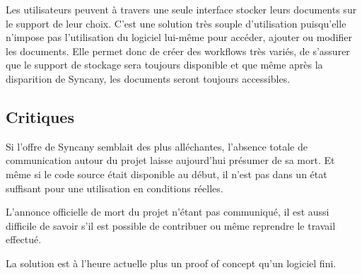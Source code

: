 \vspace{1cm}

Les utilisateurs peuvent à travers une seule interface stocker leurs documents sur le support de leur choix. C'est une solution très souple d'utilisation puisqu'elle n'impose pas l'utilisation du logiciel lui-même pour accéder, ajouter ou modifier les documents. Elle permet donc de créer des workflows très variés, de s'assurer que le support de stockage sera toujours disponible et que même après la disparition de Syncany, les documents seront toujours accessibles.

\subsection{Critiques}
Si l'offre de Syncany semblait des plus alléchantes, l'absence totale de communication autour du projet laisse aujourd'hui présumer de sa mort. Et même si le code source était disponible au début, il n'est pas dans un état suffisant pour une utilisation en conditions réelles.

L'annonce officielle de mort du projet n'étant pas communiqué, il est aussi difficile de savoir s'il est possible de contribuer ou même reprendre le travail effectué.

La solution est à l'heure actuelle plus un proof of concept qu'un logiciel fini.
